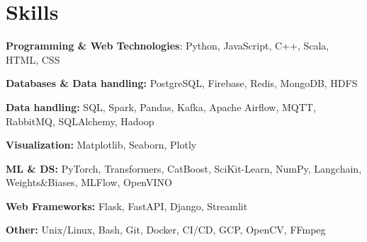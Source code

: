 \section{Skills}
 \resumeSubHeadingListStart
    \item {
        \textbf{Programming \& Web Technologies}: Python, JavaScript, C++, Scala, HTML, CSS
    }
   \vspace{-7pt}
   \item{
     \textbf{Databases \& Data handling: }{PostgreSQL, Firebase, Redis, MongoDB, HDFS}
   }
   \vspace{-7pt}
   \item{
     \textbf{Data handling: }{SQL, Spark, Pandas, Kafka, Apache Airflow, MQTT, RabbitMQ, SQLAlchemy, Hadoop}
   }
   \vspace{-7pt}
   \item{
     \textbf{Visualization: }{Matplotlib, Seaborn, Plotly}
   }
   \vspace{-7pt}
   \item{
     \textbf{ML \& DS: }{PyTorch, Transformers, CatBoost, SciKit-Learn, NumPy, Langchain, Weights\&Biases, MLFlow, OpenVINO}
   }
   \vspace{-7pt}
   \item{
     \textbf{Web Frameworks: }{Flask, FastAPI, Django, Streamlit}
   }
   \vspace{-7pt}
   \item{
     \textbf{Other: }{Unix/Linux, Bash, Git, Docker, CI/CD, GCP, OpenCV, FFmpeg}
   }
   \vspace{-7pt}
 \resumeSubHeadingListEnd
